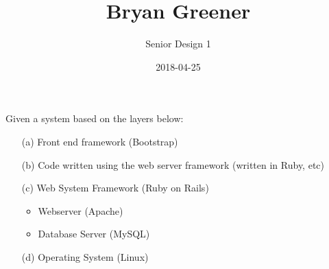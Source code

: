 \documentclass[12pt]{article}
\title{Bryan Greener}
\author{Senior Design 1}
\date{2018-04-25}
\theoremstyle{plain}
\theoremstyle{definition}
\theoremstyle{plain}
\begin{document}
\maketitle

\TabPositions{4cm}
Given a system based on the layers below:
\begin{enumerate}
\item[(a)] Front end framework (Bootstrap)
\item[(b)] Code written using the web server framework (written in Ruby, etc)
\item[(c)] Web System Framework (Ruby on Rails)
	\begin{itemize}
	\item Webserver (Apache)
	\item Database Server (MySQL)
	\end{itemize}
\item[(d)] Operating System (Linux)
\end{enumerate}
\end{document}
